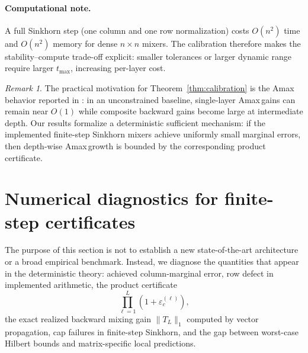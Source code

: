 \documentclass[11pt]{article}
\numberwithin{equation}{section}
\theoremstyle{plain}
\theoremstyle{definition}
\theoremstyle{remark}
\newtheorem{remark}[theorem]{Remark}
\newcommand{\Amax}{\textsf{Amax}\,}
\begin{document}
\paragraph{Computational note.}
A full Sinkhorn step (one column and one row normalization) costs $O(n^2)$ time and $O(n^2)$ memory for dense $n\times n$ mixers. The calibration therefore makes the stability--compute trade-off explicit: smaller tolerances or larger dynamic range require larger $t_{\max}$, increasing per-layer cost.

\begin{remark}
The practical motivation for Theorem~\ref{thm:calibration} is the \Amax behavior reported in \citep{Xie2025mHC}: in an unconstrained baseline, single-layer \Amax gains can remain near $O(1)$ while composite backward gains become large at intermediate depth. Our results formalize a deterministic sufficient mechanism: if the implemented finite-step Sinkhorn mixers achieve uniformly small marginal errors, then depth-wise \Amax growth is bounded by the corresponding product certificate.\end{remark}




 


\section{Numerical diagnostics for finite-step certificates}\label{sec:experiments}

The purpose of this section is not to establish a new state-of-the-art
architecture or a broad empirical benchmark.  Instead, we diagnose the
quantities that appear in the deterministic theory: achieved column-marginal
error, row defect in implemented arithmetic, the product certificate
\[
    \prod_{\ell=1}^L(1+\varepsilon_c^{(\ell)}),
\]
the exact realized backward mixing gain \(\|T_L\|_1\) computed by vector
propagation, cap failures in finite-step Sinkhorn, and the gap between
worst-case Hilbert bounds and matrix-specific local predictions.

\begin{center}
\end{center}
\end{document}
